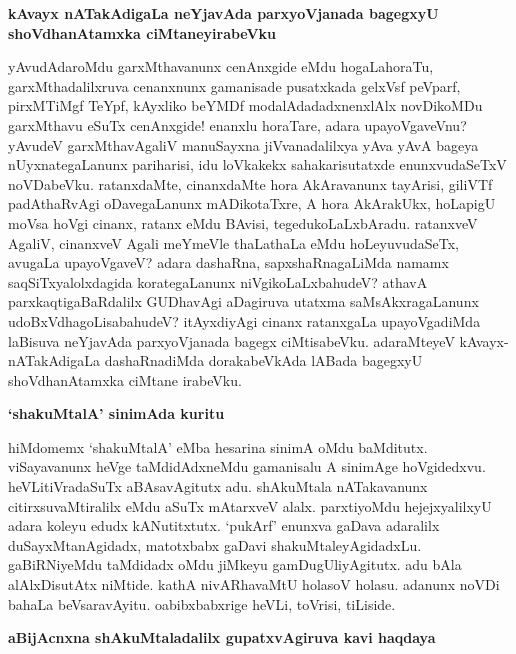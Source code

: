 {\bf kAvayx nATakAdigaLa neYjavAda parxyoVjanada bagegxyU shoVdhanAtamxka ciMtaneyirabeVku}

yAvudAdaroMdu garxMthavanunx cenAnxgide eMdu hogaLahoraTu, garxMthadalilxruva cenanxnunx gamanisade pusatxkada gelxVsf peVparf, pirxMTiMgf TeYpf, kAyxliko beYMDf modalAdadadxnenxlAlx novDikoMDu garxMthavu eSuTx cenAnxgide! enanxlu horaTare, adara upayoVgaveVnu? yAvudeV garxMthavAgaliV manuSayxna jiVvanadalilxya yAva yAvA bageya nUyxnategaLanunx pariharisi, idu loVkakekx sahakarisutatxde enunxvudaSeTxV noVDabeVku. ratanxdaMte, cinanxdaMte hora AkAravanunx tayArisi, giliVTf padAthaRvAgi oDavegaLanunx mADikotaTxre, A hora AkArakUkx, hoLapigU moVsa hoVgi cinanx, ratanx eMdu BAvisi, tegedukoLaLxbAradu. ratanxveV AgaliV, cinanxveV Agali meYmeVle thaLathaLa eMdu hoLeyuvudaSeTx, avugaLa upayoVgaveV? adara dashaRna, sapxshaRnagaLiMda namamx saqSiTxyalolxdagida korategaLanunx niVgikoLaLxbahudeV? athavA parxkaqtigaBaRdalilx GUDhavAgi aDagiruva utatxma saMsAkxragaLanunx udoBxVdhagoLisabahudeV? itAyxdiyAgi cinanx ratanxgaLa upayoVgadiMda laBisuva neYjavAda parxyoVjanada bagegx ciMtisabeVku. adaraMteyeV kAvayx-nATakAdigaLa dashaRnadiMda dorakabeVkAda lABada bagegxyU shoVdhanAtamxka ciMtane irabeVku.

{\bf `shakuMtalA' sinimAda kuritu}

hiMdomemx `shakuMtalA' eMba hesarina sinimA oMdu baMditutx. viSayavanunx heVge taMdidAdxneMdu gamanisalu A sinimAge hoVgidedxvu. heVLitiVradaSuTx aBAsavAgitutx adu. shAkuMtala nATakavanunx citirxsuvaMtiralilx eMdu aSuTx mAtarxveV alalx. parxtiyoMdu hejejxyalilxyU adara koleyu edudx kANutitxtutx. `pukArf' enunxva gaDava adaralilx duSayxMtanAgidadx, matotxbabx gaDavi shakuMtaleyAgidadxLu. gaBiRNiyeMdu taMdidadx oMdu jiMkeyu gamDugUliyAgitutx. adu bAla alAlxDisutAtx niMtide. kathA nivARhavaMtU holasoV holasu. adanunx noVDi bahaLa beVsaravAyitu. oabibxbabxrige heVLi, toVrisi, tiLiside.

{\bf aBijAcnxna shAkuMtaladalilx gupatxvAgiruva kavi haqdaya}

